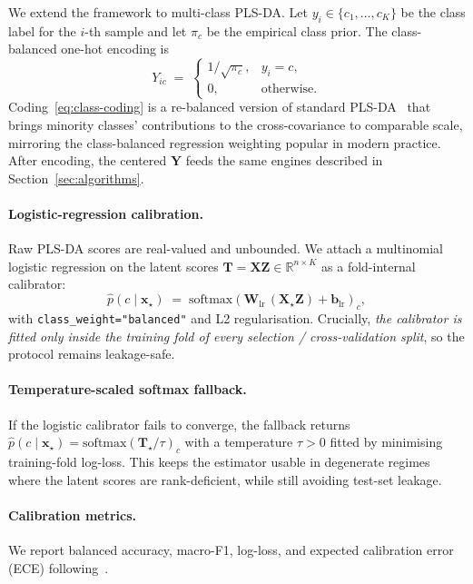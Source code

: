 \documentclass[review,a4paper]{elsarticle}
\newcommand{\R}{\mathbb{R}}
\newcommand{\softmax}{\mathrm{softmax}}
\newcommand{\Xmat}{\mathbf{X}}
\newcommand{\Ymat}{\mathbf{Y}}
\newcommand{\Tmat}{\mathbf{T}}
\newcommand{\Wmat}{\mathbf{W}}
\newcommand{\Zmat}{\mathbf{Z}}
\newcommand{\xvec}{\mathbf{x}}
\newcommand{\bvec}{\mathbf{b}}
\newcommand{\PLSDA}{\textsc{PLS-DA}\xspace}
\begin{document}
We extend the framework to multi-class \PLSDA. Let $y_i\in\{c_1,\dots,c_K\}$
be the class label for the $i$-th sample and let $\pi_c$ be the
empirical class prior. The class-balanced one-hot encoding is
\begin{equation}
Y_{ic} \;=\; \begin{cases}
1/\sqrt{\pi_c}, & y_i = c, \\
0, & \text{otherwise.}
\end{cases}
\label{eq:class-coding}
\end{equation}
Coding~\eqref{eq:class-coding} is a re-balanced version of standard
\PLSDA~\cite{barker2003plsda, indahl2007twostep} that brings minority
classes' contributions to the cross-covariance to comparable scale,
mirroring the class-balanced regression weighting popular in modern
practice. After encoding, the centered $\Ymat$ feeds the same engines
described in Section~\ref{sec:algorithms}.

\paragraph{Logistic-regression calibration.}
Raw \PLSDA scores are real-valued and unbounded. We attach a
multinomial logistic regression on the latent scores
$\Tmat=\Xmat\Zmat\in\R^{n\times K}$ as a fold-internal calibrator:
\begin{equation}
\hat{p}(c\mid\xvec_\star) \;=\; \softmax(\Wmat_{\mathrm{lr}}\,
(\Xmat_\star\Zmat) + \bvec_{\mathrm{lr}})_c,
\end{equation}
with \verb|class_weight="balanced"| and L2 regularisation. Crucially,
\emph{the calibrator is fitted only inside the training fold of every
selection / cross-validation split}, so the protocol remains
leakage-safe.

\paragraph{Temperature-scaled softmax fallback.}
If the logistic calibrator fails to converge, the fallback returns
$\hat{p}(c\mid\xvec_\star)=\softmax(\Tmat_\star/\tau)_c$ with a
temperature $\tau>0$ fitted by minimising training-fold log-loss. This
keeps the estimator usable in degenerate regimes where the latent
scores are rank-deficient, while still avoiding test-set leakage.

\paragraph{Calibration metrics.}
We report balanced accuracy, macro-F1, log-loss, and expected
calibration error (ECE) following~\cite{guo2017calibration,
naeini2015obtaining}.
\end{document}
